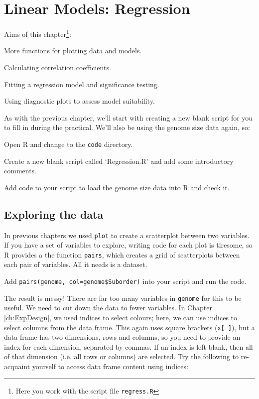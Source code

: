 \chapter{Linear Models: Regression}
\label{ch:regress}

Aims of this chapter\footnote{Here you work with the script file {\tt regress.R}}:

\begin{compactitem}
	\item More functions for plotting data and models.
	\item Calculating correlation coefficients.
	\item Fitting a regression model and significance testing.
	\item Using diagnostic plots to assess model suitability.
\end{compactitem}

As with the previous chapter, we'll start with creating a new blank 
script for you to fill in during the practical. We'll also be using the 
genome size data again, so:

\begin{compactitem}[$\quad\star$]
	\item Open R and change to the {\tt code} directory.
	\item Create a new blank script called `Regression.R' and add some 
	introductory comments.
	\item Add code to your script to load the genome size data into R and 
	check it.
\end{compactitem}

\section{Exploring the data}

In previous chapters we used {\tt plot} to create a scatterplot between 
two variables. If you have a set of variables to explore, writing code 
for each plot is tiresome, so R provides a the function {\tt pairs}, 
which creates a grid of scatterplots between each pair of variables. 
All it needs is a dataset.

\begin{compactitem}[$\quad\star$]
	\item Add {\tt pairs(genome, col=genome\$Suborder)} into your script 
	and run the code. 
\end{compactitem}

The result is messy! There are far too many variables in {\tt genome} 
for this to be useful. We need to cut down the data to fewer variables. 
In Chapter \ref{ch:ExpDesign}, we used indices to select colours; here, we can use 
indices to select columns from the data frame. This again uses square 
brackets ({\tt x[ ]}), but a data frame has two dimensions, rows and 
columns, so  you need to provide an index for each dimension, separated 
by commas. If an index is left blank, then all of that dimension (i.e. 
all rows or columns) are selected. Try the following to re-acquaint 
yourself to access data frame content using indices:  

